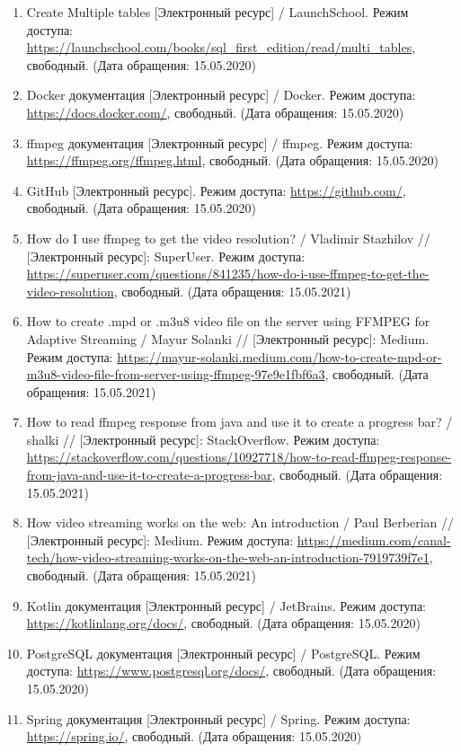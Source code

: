 \documentclass{../includes/TechDoc}
\begin{document}
\begin{enumerate}
        \item Create Multiple tables [Электронный ресурс] / LaunchSchool. Режим доступа: \url{https://launchschool.com/books/sql_first_edition/read/multi_tables}, свободный. (Дата обращения: 15.05.2020)
        \item Docker документация [Электронный ресурс] / Docker. Режим доступа: \url{https://docs.docker.com/}, свободный. (Дата обращения: 15.05.2020)
        \item ffmpeg документация [Электронный ресурс] / ffmpeg. Режим доступа: \url{https://ffmpeg.org/ffmpeg.html}, свободный. (Дата обращения: 15.05.2020)
        \item GitHub [Электронный ресурс]. Режим доступа: \url{https://github.com/}, свободный. (Дата обращения: 15.05.2020)
        \item How do I use ffmpeg to get the video resolution? / Vladimir Stazhilov // [Электронный ресурс]: SuperUser. Режим доступа: \url{https://superuser.com/questions/841235/how-do-i-use-ffmpeg-to-get-the-video-resolution}, свободный. (Дата обращения: 15.05.2021)
        \item How to create .mpd or .m3u8 video file on the server using FFMPEG for Adaptive Streaming / Mayur Solanki // [Электронный ресурс]: Medium. Режим доступа: \url{https://mayur-solanki.medium.com/how-to-create-mpd-or-m3u8-video-file-from-server-using-ffmpeg-97e9e1fbf6a3}, свободный. (Дата обращения: 15.05.2021)
        \item How to read ffmpeg response from java and use it to create a progress bar? / shalki // [Электронный ресурс]: StackOverflow. Режим доступа: \url{https://stackoverflow.com/questions/10927718/how-to-read-ffmpeg-response-from-java-and-use-it-to-create-a-progress-bar}, свободный. (Дата обращения: 15.05.2021)
        \item How video streaming works on the web: An introduction / Paul Berberian // [Электронный ресурс]: Medium. Режим доступа: \url{https://medium.com/canal-tech/how-video-streaming-works-on-the-web-an-introduction-7919739f7e1}, свободный. (Дата обращения: 15.05.2021)
        \item Kotlin документация [Электронный ресурс] / JetBrains. Режим доступа: \url{https://kotlinlang.org/docs/}, свободный. (Дата обращения: 15.05.2020)
        \item PostgreSQL документация [Электронный ресурс] / PostgreSQL. Режим доступа: \url{https://www.postgresql.org/docs/}, свободный. (Дата обращения: 15.05.2020)
        \item Spring документация [Электронный ресурс] / Spring. Режим доступа: \url{https://spring.io/}, свободный. (Дата обращения: 15.05.2020)

\end{enumerate}
\end{document}
